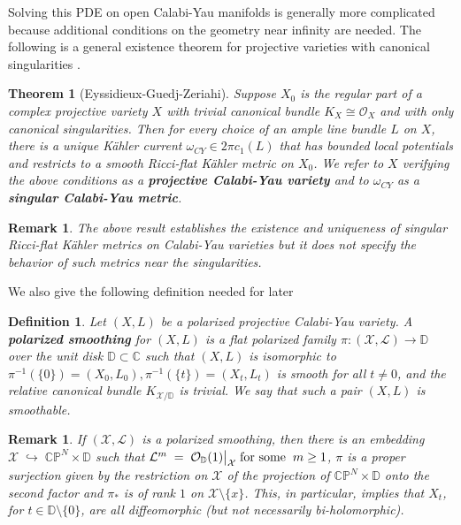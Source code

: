 \documentclass[a4paper,11pt]{article}
\newcounter{mythm}[section]
\newtheorem{tm}[mythm]{Theorem}
\newtheorem{defi}[mythm]{Definition}
\newtheorem{rem}[mythm]{Remark}
\def\C{\mathbb{C}}
\begin{document}
Solving this PDE on open Calabi-Yau manifolds is generally more complicated because additional conditions on the geometry near infinity are needed. The following is a general existence theorem for projective varieties with canonical singularities \cite{eyssidieux_singular_2009}.
\begin{tm}[Eyssidieux-Guedj-Zeriahi] \label{EGZ}
 Suppose $X_0$ is the regular part of a complex projective variety $X$ with trivial canonical bundle $K_X \cong \mathcal{O}_X$ and with only canonical singularities. Then for every choice of an ample line bundle $L$ on $X$, there is a unique Kähler current $\omega_{CY} \in 2 \pi c_1(L)$  that has bounded local potentials and restricts to a smooth Ricci-flat Kähler metric on $X_0$. We refer to $X$ verifying the above conditions as a \textbf{projective Calabi-Yau variety} and to $\omega_{CY}$ as a \textbf{singular Calabi-Yau metric}.  
\end{tm}
\begin{rem}
    The above result establishes the existence and uniqueness of singular Ricci-flat Kähler metrics on Calabi-Yau varieties but it does not specify the behavior of such metrics near the singularities.
\end{rem}
We also give the following definition needed for later 
\begin{defi} \label{polsmo}
Let $(X, L)$ be a polarized projective Calabi-Yau variety. A \textit{\textbf{polarized smoothing}} for $(X, L)$ is a flat polarized family $\pi:(\mathcal{X}, \mathcal{L}) \rightarrow \mathbb{D}$ over the unit disk $\mathbb{D} \subset \C$ such that $(X, L)$ is isomorphic to $\pi^{-1}(\{0\})=\left(X_0, L_0\right), \pi^{-1}(\{t\})=\left(X_t, L_t\right)$ is smooth for all $t \neq 0$, and the relative canonical bundle $K_{\mathcal{X} / \mathbb{D}}$ is trivial. We say that such a pair $(X,L)$ is smoothable.
\end{defi}
\begin{rem}
    If $(\mathcal{X}, \mathcal{L})$ is a polarized smoothing, then there is an embedding
$
  \mathcal{X} \;\hookrightarrow\; \mathbb{CP}^N \times \mathbb{D}
$ such that
$
  \mathcal{L}^m \;=\; \mathcal{O}_{\mathbb{D}}(1)\bigl|_{\mathcal{X}}
  \hspace{0.1cm}\text{for some} \hspace{0.2cm} m \ge 1
$, $\pi$ is a proper surjection given by the restriction on $\mathcal{X}$ of the projection of
$\mathbb{CP}^N \times \mathbb{D}$ onto the second factor and $\pi_*$ is of rank $1$ on $\mathcal{X} \setminus \{ x\}$. This, in particular, implies that $X_{t}$, for $t \in \mathbb{D} \setminus \{0\}$, are all diffeomorphic (but not necessarily bi-holomorphic).
\end{rem}
\end{document}
